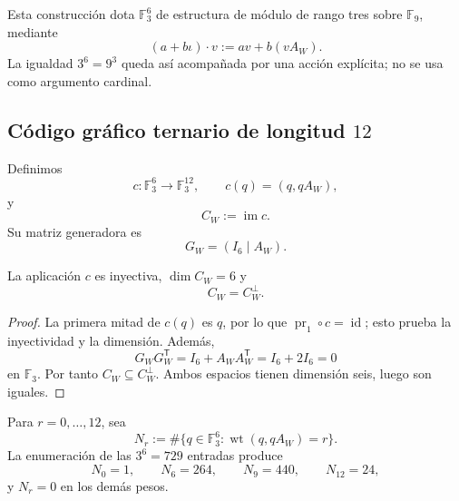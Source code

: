 Esta construcción dota \(\mathbb F_3^6\) de estructura de módulo de rango
tres sobre \(\mathbb F_9\), mediante
\begin{equation}
 (a+b\iota)\cdot v:=av+b(vA_W).
 \label{p12-83-c20-s1:eq:accion-f9-sobre-f3-seis}
\end{equation}
La igualdad \(3^6=9^3\) queda así acompañada por una acción explícita; no
se usa como argumento cardinal.

\subsection{Código gráfico ternario de longitud \(12\)}

Definimos
\begin{equation}
 c:\mathbb F_3^6\longrightarrow\mathbb F_3^{12},
 \qquad
 c(q)=(q,qA_W),
 \label{p12-83-c20-s1:eq:aplicacion-codigo-grafico-witt}
\end{equation}
y
\begin{equation}
 C_W:=\operatorname{im}c.
 \label{p12-83-c20-s1:eq:definicion-codigo-witt-ternario}
\end{equation}
Su matriz generadora es
\[
 G_W=(I_6\mid A_W).
\]

\begin{theorem}
\label{p12-83-c20-s1:thm:cw-inyectivo-autodual}
La aplicación \(c\) es inyectiva, \(\dim C_W=6\) y
\begin{equation}
 \boxed{C_W=C_W^\perp.}
 \label{p12-83-c20-s1:eq:cw-autodual}
\end{equation}
\end{theorem}

\begin{proof}
La primera mitad de \(c(q)\) es \(q\), por lo que
\(\operatorname{pr}_1\circ c=\operatorname{id}\); esto prueba la
inyectividad y la dimensión. Además,
\[
 G_WG_W^{\mathsf T}
 =I_6+A_WA_W^{\mathsf T}
 =I_6+2I_6=0
\]
en \(\mathbb F_3\). Por tanto \(C_W\subseteq C_W^\perp\). Ambos espacios
tienen dimensión seis, luego son iguales.
\end{proof}

Para \(r=0,\ldots,12\), sea
\[
 N_r:=\#\{q\in\mathbb F_3^6:
            \operatorname{wt}(q,qA_W)=r\}.
\]
La enumeración de las \(3^6=729\) entradas produce
\begin{equation}
 N_0=1,
 \qquad
 N_6=264,
 \qquad
 N_9=440,
 \qquad
 N_{12}=24,
 \label{p12-83-c20-s1:eq:censo-pesos-cw}
\end{equation}
y \(N_r=0\) en los demás pesos.

